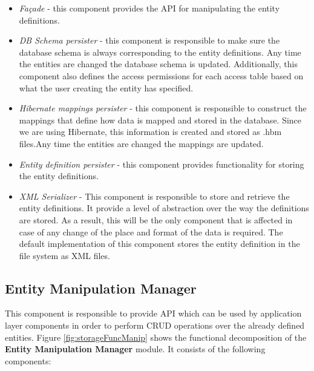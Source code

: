 \begin{itemize}
	\item \textit{Façade} - this component provides the API for manipulating the entity definitions.
	
	\item \textit{DB Schema persister} - this component is responsible to make sure the database schema is always corresponding to the entity definitions. Any time the entities are changed the database schema is updated. Additionally, this component also defines the access permissions for each access table based on what the user creating the entity has specified.
	
	\item \textit{Hibernate mappings persister} - this component is responsible to construct the mappings that define how data is mapped and stored in the database. Since we are using Hibernate, this information is created and stored as .hbm files.Any time the entities are changed the mappings are updated.
	
	\item \textit{Entity definition persister} - this component provides functionality for storing the entity definitions.
	
	\item \textit{XML Serializer} -  This component is responsible to store and retrieve the entity definitions. It provide a level of abstraction over the way the definitions are stored. As a result, this will be the only component that is affected in case of any change of the place and format of the data is required. The default implementation of this component stores the entity definition in the file system as XML files.
\end{itemize}

\subsection{Entity Manipulation Manager}

This component is responsible to provide API which can be used by application layer components in order to perform CRUD operations over the already defined entities. Figure \ref{fig:storageFuncManip} shows the functional decomposition of the \textbf{Entity Manipulation Manager} module. It consists of the following components:

